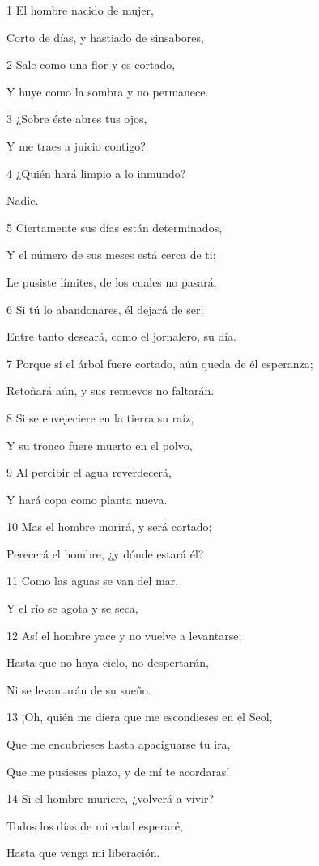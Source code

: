 \par 1 El hombre nacido de mujer,
\par Corto de días, y hastiado de sinsabores,
\par 2 Sale como una flor y es cortado,
\par Y huye como la sombra y no permanece.
\par 3 ¿Sobre éste abres tus ojos,
\par Y me traes a juicio contigo?
\par 4 ¿Quién hará limpio a lo inmundo?
\par Nadie.
\par 5 Ciertamente sus días están determinados,
\par Y el número de sus meses está cerca de ti;
\par Le pusiste límites, de los cuales no pasará.
\par 6 Si tú lo abandonares, él dejará de ser;
\par Entre tanto deseará, como el jornalero, su día.
\par 7 Porque si el árbol fuere cortado, aún queda de él esperanza;
\par Retoñará aún, y sus renuevos no faltarán.
\par 8 Si se envejeciere en la tierra su raíz,
\par Y su tronco fuere muerto en el polvo,
\par 9 Al percibir el agua reverdecerá,
\par Y hará copa como planta nueva.
\par 10 Mas el hombre morirá, y será cortado;
\par Perecerá el hombre, ¿y dónde estará él?
\par 11 Como las aguas se van del mar,
\par Y el río se agota y se seca,
\par 12 Así el hombre yace y no vuelve a levantarse;
\par Hasta que no haya cielo, no despertarán,
\par Ni se levantarán de su sueño.
\par 13 ¡Oh, quién me diera que me escondieses en el Seol,
\par Que me encubrieses hasta apaciguarse tu ira,
\par Que me pusieses plazo, y de mí te acordaras!
\par 14 Si el hombre muriere, ¿volverá a vivir?
\par Todos los días de mi edad esperaré,
\par Hasta que venga mi liberación.
